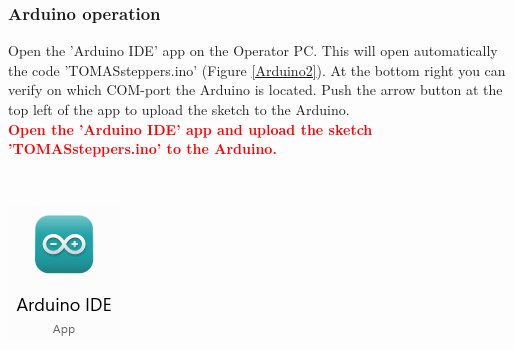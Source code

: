 \documentclass[fleqn,a4paper,20pt]{article}
\begin{document}
\begin{minipage}{.68\textwidth}
\begin{minipage}{.76\textwidth}
\subsubsection{Arduino operation} Open the 'Arduino IDE' app on the Operator PC. This will open automatically the code 'TOMASsteppers.ino' (Figure \ref{Arduino2}). At the bottom right you can verify on which COM-port the Arduino is located. Push the arrow button at the top left of the app to upload the sketch to the Arduino.\\

\textcolor{red}{\textbf{Open the 'Arduino IDE' app and upload the sketch 'TOMASsteppers.ino' to the Arduino.}}\\

\end{minipage}
\begin{minipage}{.02\textwidth}
$\ $\\
\end{minipage}
\begin{minipage}{.2\textwidth}
\centering
\includegraphics[width=\linewidth]{Arduino1}
\end{minipage}

\end{minipage}
\end{document}
